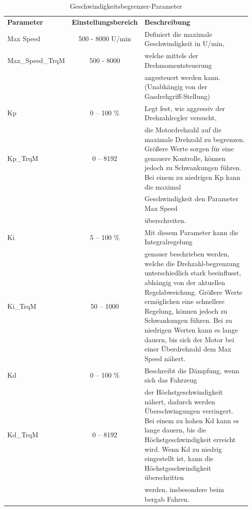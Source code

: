 \begin{table}[H]
	\begin{tabular}{|lcp{8cm}|}\hline
	\rowcolor[gray]{0.8}\textbf{Parameter} & \textbf{Einstellungsbereich} &\textbf{Beschreibung}\\[3pt]
		Max Speed & 500 - 8000 U/min & Definiert die maximale Geschwindigkeit in U/min,\\
		Max\_Speed\_TrqM & 500 - 8000	& welche mittels der Drehmomentsteuerung\\&& angesteuert werden kann. (Unabhängig von der Gasdrehgriff-Stellung)\\\hline
		Kp 	& 0 – 100 \% 	& Legt fest, wie aggressiv der Drehzahlregler versucht,\\
		Kp\_TrqM	& 0 – 8192			& die Motordrehzahl auf die maximale Drehzahl zu begrenzen. Größere Werte sorgen für eine genauere Kontrolle, können jedoch zu Schwankungen führen. Bei einem zu niedrigen Kp kann die maximal\\&& Geschwindigkeit den Parameter Max Speed\\&& überschreiten.\\\hline
		Ki 			& 5 – 100 \% 		& Mit diesem Parameter kann die Integralregelung\\
		Ki\_TrqM	& 50 – 1000 		& genauer beschrieben werden, welche die Drehzahl-begrenzung unterschiedlich stark beeinflusst, abhängig von der aktuellen Regelabweichung. Größere Werte ermöglichen eine schnellere Regelung, können jedoch zu Schwankungen führen. Bei zu niedrigen Werten kann es lange dauern, bis sich der Motor bei einer Überdrehzahl dem Max Speed nähert. \\\hline
		Kd    		& 0 – 100 \% 	& Beschreibt die Dämpfung, wenn sich das Fahrzeug\\
		Kd\_TrqM	& 0 – 8192	 	& der Höchstgeschwindigkeit nähert, dadurch werden Überschwingungen verringert. Bei einem zu hohen Kd kann es lange dauern, bis die Höchstgeschwindigkeit erreicht wird. Wenn Kd zu niedrig eingestellt ist, kann die Höchstgeschwindigkeit überschritten\\&& werden, insbesondere beim bergab Fahren. \\\hline	
	\end{tabular}	
	\caption{Geschwindigkeitsbegrenzer-Parameter}
	\label{tab:Geschwindigkeitsbegrenzer-Parameter}
\end{table}

\newpage

